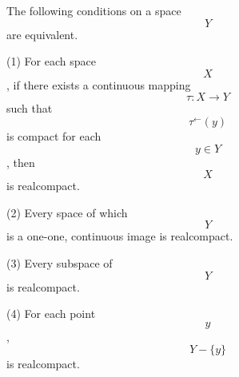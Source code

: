 The following conditions on a space $$Y$$ are equivalent.

(1) For each space $$X$$, if there exists a continuous mapping $$\tau: X \to Y$$ such that $$\tau^{\leftarrow}(y)$$ is compact for each $$y \in Y$$, then $$X$$ is realcompact.

(2) Every space of which $$Y$$ is a one-one, continuous image is realcompact.

(3) Every subspace of $$Y$$ is realcompact.

(4) For each point $$y$$, $$Y - \{y\}$$ is realcompact.
